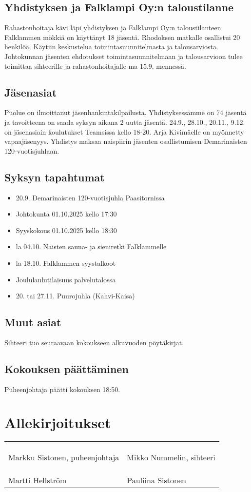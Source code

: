 \documentclass[a4paper,12pt]{article}
\begin{document}
\subsection{Yhdistyksen ja Falklampi Oy:n taloustilanne}
Rahastonhoitaja kävi läpi yhdistyksen ja Falklampi Oy:n taloustilanteen. Falklammen mökkiä on käyttänyt 18 jäsentä. Rhodoksen matkalle osallistui 20 henkilöä. Käytiin keskustelua toimintasuunnitelmasta ja talousarviosta. Johtokunnan jäsenten ehdotukset toimintasuunnitelmaan ja talousarvioon tulee toimittaa sihteerille ja rahastonhoitajalle ma 15.9. mennessä.
\subsection{Jäsenasiat}
Puolue on ilmoittanut jäsenhankintakilpailusta. Yhdistyksessämme on 74 jäsentä ja tavoitteena on saada syksyn aikana 2 uutta jäsentä. 24.9., 28.10., 20.11., 9.12. on jäsenasiain koulutukset Teamsissa kello 18-20. Arja Kivimäelle on myönnetty vapaajäsenyys. Yhdistys maksaa naispiirin jäsenten osallistumisen Demarinaisten 120-vuotisjuhlaan.
\subsection{Syksyn tapahtumat}
\begin{itemize}
\item{20.9. Demarinaisten 120-vuotisjuhla Paasitornissa}
\item{Johtokunta 01.10.2025 kello 17:30}
\item{Syyskokous 01.10.2025 kello 18:30}
\item{la 04.10. Naisten sauna- ja sieniretki Falklammelle}
\item{la 18.10. Falklammen syystalkoot}
\item{Joululaulutilaisuus palvelutalossa}
\item{20. tai 27.11. Puurojuhla (Kahvi-Kaisa)}
\end{itemize}
\subsection{Muut asiat}
Sihteeri tuo seuraavaan kokoukseen alkuvuoden pöytäkirjat.
\subsection{Kokouksen päättäminen}
Puheenjohtaja päätti kokouksen 18:50.
\section*{Allekirjoitukset}
\begin{flushleft}
\begin{tabular}{ll}
& \\
& \\
& \\
Markku Sistonen, puheenjohtaja &
Mikko Nummelin, sihteeri \\
& \\
& \\
& \\
Martti Hellström &
Pauliina Sistonen
\end{tabular}
\end{flushleft}
\end{document}
